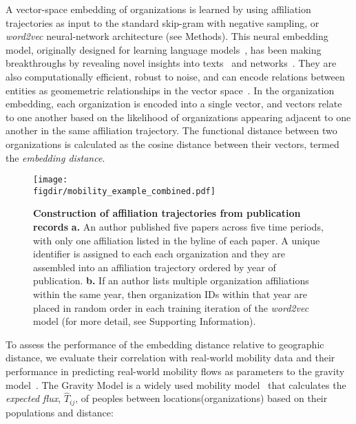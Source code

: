 \documentclass[12pt]{article} %
\def\figdir{../Figs}
\def\SI{Supporting Information}
\begin{document}
A vector-space embedding of organizations is learned by using affiliation trajectories as input to the standard skip-gram with negative sampling, or \textit{word2vec} neural-network architecture (see Methods).
This neural embedding model, originally designed for learning language models~\autocite{mikolov2013word2vec}, has been making breakthroughs by revealing novel insights into texts~\autocite{linzhuo2020hyperbolic, tshitoyan2019mat2vec, garg2018gender, kozlowski2018geometry, hamilton2016diachronic, le2014doc2vec, nakandala2017gendered} and networks~\autocite{perozzi2014deepwalk, grover2016node2vec}.
They are also computationally efficient, robust to noise, and can encode relations between entities as geomemetric relationships in the vector space~\autocite{levy2014neural, nakandala2017gendered, kozlowski2018geometry, an2018semaxis}.
In the organization embedding, each organization is encoded into a single vector, and vectors relate to one another based on the likelihood of organizations appearing adjacent to one another in the same affiliation trajectory.
The functional distance between two organizations is calculated as the cosine distance between their vectors, termed the \textit{embedding distance}.

%
%
\begin{figure}[ht!]
    \centering
    \texttt{[image: \\figdir/mobility\_example\_combined.pdf]}
    \caption{
        \textbf{Construction of affiliation trajectories from publication records}
        \textbf{a.}
        An author published five papers across five time periods, with only one affiliation listed in the byline of each paper.
        A unique identifier is assigned to each each organization and they are assembled into an affiliation trajectory ordered by year of publication.
        \textbf{b.}
        If an author lists multiple organization affiliations within the same year, then organization IDs within that year are placed in random order in each training iteration of the \textit{word2vec} model (for more detail, see \SI).
    }
    \label{fig:methods:mobility_sentence}
\end{figure}

To assess the performance of the embedding distance relative to geographic distance, we evaluate their correlation with real-world mobility data and their performance in predicting real-world mobility flows as parameters to the gravity model~\autocite{zipf1946gravity, barbosa2018human}.
The Gravity Model is a widely used mobility model~\autocite{curiel2018citygravity, lewer2008immigrationgravity, jung2008highwaygravity, hong2016busgravity, truscott2012epidemicgravity, xia2005measlesgravity} that calculates the \textit{expected flux}, $\hat{T}_{ij}$, of peoples between locations(organizations) based on their populations and distance:
\end{document}
